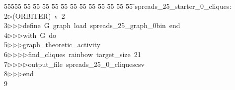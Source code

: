 %
%
\begin{tabbing}
55555 \= 55 \= 55 \= 55 \= 55 \= 55 \= 55 \= 55 \= 55 \= 55 \= 55 \= 55 \= 55 \= \>spreads\_25\_starter\_0\_cliques:\\[0pt]
2\>$\triangleright$\>(ORBITER)\ v\ 2\ \\[0pt]
3\>$\triangleright$\>$\triangleright$\>$\triangleright$\>define\ G\ graph\ load\ spreads\_25\_graph\_0bin\ end\ \\[0pt]
4\>$\triangleright$\>$\triangleright$\>$\triangleright$\>with\ G\ do\ \\[0pt]
5\>$\triangleright$\>$\triangleright$\>$\triangleright$\>graph\_theoretic\_activity\ \\[0pt]
6\>$\triangleright$\>$\triangleright$\>$\triangleright$\>$\triangleright$\>find\_cliques\ rainbow\ target\_size\ 21\ \\[0pt]
7\>$\triangleright$\>$\triangleright$\>$\triangleright$\>$\triangleright$\>output\_file\ spreads\_25\_0\_cliquescsv\ \\[0pt]
8\>$\triangleright$\>$\triangleright$\>$\triangleright$\>end\ \\[0pt]
9\>\end{tabbing}
